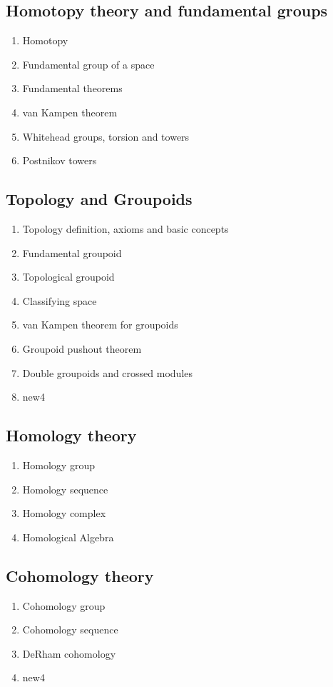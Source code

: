 \documentclass[12pt]{article}
\theoremstyle{plain}
\theoremstyle{definition}
\numberwithin{equation}{section}
\begin{document}
\subsection{Homotopy theory and fundamental groups}
\begin{enumerate}
\item Homotopy
\item Fundamental group of a space
\item Fundamental theorems
\item van Kampen theorem
\item Whitehead groups, torsion and towers
\item Postnikov towers
\end{enumerate}


\subsection{Topology and Groupoids}
\begin{enumerate}
\item Topology definition, axioms and basic concepts
\item Fundamental groupoid
\item Topological groupoid
\item Classifying space
\item van Kampen theorem for groupoids
\item Groupoid pushout theorem 
\item Double groupoids and crossed modules
\item new4

\end{enumerate}


\subsection{Homology theory}
\begin{enumerate}

\item Homology group
\item Homology sequence
\item Homology complex
\item Homological Algebra

\end{enumerate}


\subsection{Cohomology theory}
\begin{enumerate}

\item Cohomology group
\item Cohomology sequence
\item DeRham cohomology
\item new4

\end{enumerate}
\end{document}
